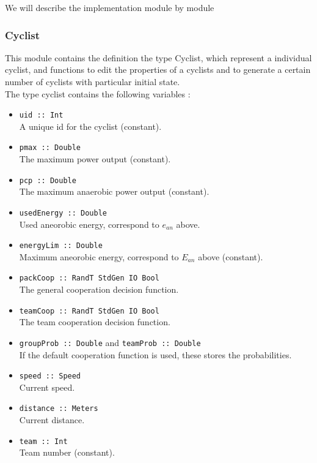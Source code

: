 \documentclass[10pt, a4paper]{report}
\begin{document}
We will describe the implementation module by module

\subsubsection{Cyclist}

This module contains the definition the type Cyclist, which represent a individual cyclist, and functions to edit the properties of a cyclists and to generate a certain number of cyclists with particular initial state. \\

The type cyclist contains the following variables : 

\begin{itemize}
\item \texttt{uid :: Int} \\ A unique id for the cyclist (constant).
\item \texttt{pmax :: Double} \\ The maximum power output (constant).
\item \texttt{pcp :: Double} \\ The maximum anaerobic power output (constant).
\item \texttt{usedEnergy :: Double} \\ Used aneorobic energy, correspond to $e_{an}$ above.
\item \texttt{energyLim :: Double} \\ Maximum aneorobic energy, correspond to $E_{an}$ above (constant).
\item \texttt{packCoop :: RandT StdGen IO Bool} \\ The general cooperation decision function.
\item \texttt{teamCoop :: RandT StdGen IO Bool} \\ The team cooperation decision function.
\item \texttt{groupProb :: Double} and \texttt{teamProb :: Double} \\ If the default cooperation function is used, these stores the probabilities.
\item \texttt{speed :: Speed} \\ Current speed.
\item \texttt{distance :: Meters} \\ Current distance.
\item \texttt{team :: Int} \\ Team number (constant).
\end{itemize}
\end{document}
